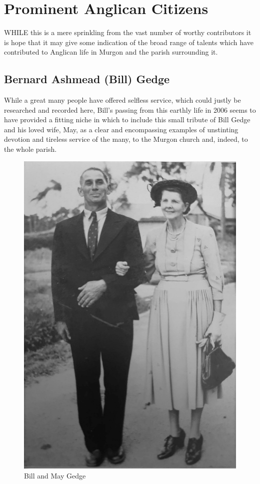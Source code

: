 \balance


\printendnotes[custom]
\setcounter{endnote}{0}
\chapter{Prominent Anglican Citizens}
\nobalance


\lettrine[lines=3]{W}{HILE}
 this is a mere sprinkling from the vast number of worthy contributors it is hope that it may give some indication of the broad range of talents which have contributed to Anglican life in Murgon and the parish surrounding it.

\section{Bernard Ashmead (Bill) Gedge}



While a great many people have offered selfless service, which could justly be researched and recorded here, Bill's passing from this earthly life in 2006 seems to have provided a fitting niche in which to include this small tribute of Bill Gedge and his loved wife, May, as a clear and encompassing examples of unstinting devotion and tireless service of the many, to the Murgon church and, indeed, to the whole parish.









\begin{figure}
\begin{center}
\includegraphics[width=.7\linewidth,center]{../images/BillAndMayGedge.jpg}
\caption{Bill and May Gedge}
\end{center}
\end{figure}





